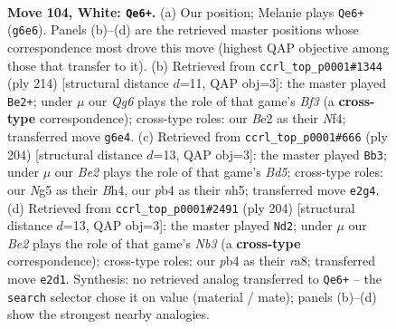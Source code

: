 \documentclass[11pt]{article}
\begin{document}
\clearpage

\begin{figure}[p]\centering
\begin{subfigure}{0.46\textwidth}\centering
\resizebox{\linewidth}{!}{%
\newchessgame
\chessboard[
  setfen={8/8/6Q1/3k2N1/1p6/4K3/4B3/8 w - - 1 104},
  showmover=false,
  pgfstyle=straightmove, color=movearrow, markmove={g6-e6}
]}
\caption{}
\end{subfigure}\hfill
\begin{subfigure}{0.46\textwidth}\centering
\resizebox{\linewidth}{!}{%
\newchessgame
\chessboard[
  setfen={8/8/8/8/5N2/4KB2/8/5k2 w - - 42 108},
  showmover=false,
  pgfstyle=straightmove, color=movearrow, markmove={f3-e2}
]}
\caption{}
\end{subfigure}
\\[4pt]
\begin{subfigure}{0.46\textwidth}\centering
\resizebox{\linewidth}{!}{%
\newchessgame
\chessboard[
  setfen={8/3k4/8/3BK2n/7B/8/8/8 w - - 3 103},
  showmover=false,
  pgfstyle=straightmove, color=movearrow, markmove={d5-b3}
]}
\caption{}
\end{subfigure}\hfill
\begin{subfigure}{0.46\textwidth}\centering
\resizebox{\linewidth}{!}{%
\newchessgame
\chessboard[
  setfen={r7/8/3k4/8/2K5/1N6/8/8 w - - 0 103},
  showmover=false,
  pgfstyle=straightmove, color=movearrow, markmove={b3-d2}
]}
\caption{}
\end{subfigure}
\caption{\textbf{Move 104, White: \texttt{Qe6+}.} (a) Our position; Melanie plays \texttt{Qe6+} (\texttt{g6e6}). Panels (b)--(d) are the retrieved master positions whose correspondence most drove this move (highest QAP objective among those that transfer to it). (b) Retrieved from \texttt{ccrl\_top\_p0001\#1344} (ply 214) [structural distance $d$=11, QAP obj=3]: the master played \texttt{Be2+}; under $\mu$ our \emph{Qg6} plays the role of that game's \emph{Bf3} (a \textbf{cross-type} correspondence); cross-type roles: our \emph{B}e2 as their \emph{N}f4; transferred move \texttt{g6e4}. (c) Retrieved from \texttt{ccrl\_top\_p0001\#666} (ply 204) [structural distance $d$=13, QAP obj=3]: the master played \texttt{Bb3}; under $\mu$ our \emph{Be2} plays the role of that game's \emph{Bd5}; cross-type roles: our \emph{N}g5 as their \emph{B}h4, our \emph{p}b4 as their \emph{n}h5; transferred move \texttt{e2g4}. (d) Retrieved from \texttt{ccrl\_top\_p0001\#2491} (ply 204) [structural distance $d$=13, QAP obj=3]: the master played \texttt{Nd2}; under $\mu$ our \emph{Be2} plays the role of that game's \emph{Nb3} (a \textbf{cross-type} correspondence); cross-type roles: our \emph{p}b4 as their \emph{r}a8; transferred move \texttt{e2d1}. Synthesis: no retrieved analog transferred to \texttt{Qe6+} -- the \texttt{search} selector chose it on value (material / mate); panels (b)--(d) show the strongest nearby analogies.}
\label{fig:thought-m206}
\end{figure}
\end{document}
